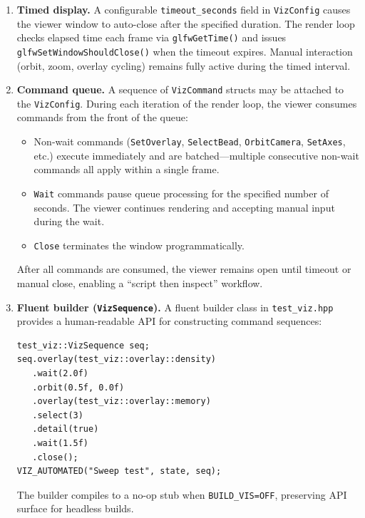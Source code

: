 \documentclass[11pt]{article}
\newcommand{\file}[1]{\texttt{#1}}
\newcommand{\type}[1]{\texttt{#1}}
\newcommand{\fn}[1]{\texttt{#1}}
\begin{document}
\begin{enumerate}
    \item \textbf{Timed display.}
          A configurable \fn{timeout\_seconds} field in \type{VizConfig}
          causes the viewer window to auto-close after the specified
          duration.  The render loop checks elapsed time each frame via
          \fn{glfwGetTime()} and issues \fn{glfwSetWindowShouldClose()}
          when the timeout expires.  Manual interaction (orbit, zoom,
          overlay cycling) remains fully active during the timed
          interval.

    \item \textbf{Command queue.}
          A sequence of \type{VizCommand} structs may be attached to the
          \type{VizConfig}.  During each iteration of the render loop,
          the viewer consumes commands from the front of the queue:
          \begin{itemize}
              \item Non-wait commands (\fn{SetOverlay}, \fn{SelectBead},
                    \fn{OrbitCamera}, \fn{SetAxes}, etc.) execute
                    immediately and are batched—multiple consecutive
                    non-wait commands all apply within a single frame.
              \item \fn{Wait} commands pause queue processing for the
                    specified number of seconds.  The viewer continues
                    rendering and accepting manual input during the
                    wait.
              \item \fn{Close} terminates the window programmatically.
          \end{itemize}
          After all commands are consumed, the viewer remains open until
          timeout or manual close, enabling a ``script then inspect''
          workflow.

    \item \textbf{Fluent builder (\type{VizSequence}).}
          A fluent builder class in \file{test\_viz.hpp} provides a
          human-readable API for constructing command sequences:
          \begin{lstlisting}
test_viz::VizSequence seq;
seq.overlay(test_viz::overlay::density)
   .wait(2.0f)
   .orbit(0.5f, 0.0f)
   .overlay(test_viz::overlay::memory)
   .select(3)
   .detail(true)
   .wait(1.5f)
   .close();
VIZ_AUTOMATED("Sweep test", state, seq);
          \end{lstlisting}
          The builder compiles to a no-op stub when
          \texttt{BUILD\_VIS=OFF}, preserving API surface for headless
          builds.
\end{enumerate}
\end{document}

